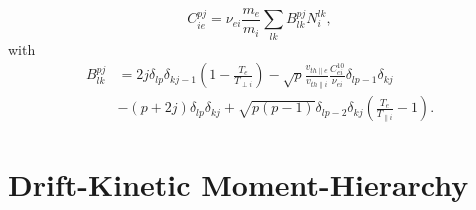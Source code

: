 {{%
\begin{equation}
    C_{ie}^{pj}=\nu_{ei}\frac{m_e}{m_i}\sum_{lk}B_{lk}^{pj}N_{i}^{lk},
    \label{eq:ciepj}
\end{equation}
%
with
%
\begin{equation}
\begin{split}
    B_{lk}^{pj}&=2j\delta_{lp}\delta_{kj-1}\left(1-\frac{T_e}{T_{\perp i}}\right)-\sqrt{ p}\frac{v_{th\parallel e}}{v_{th\parallel i}}\frac{C_{ei}^{10}}{\nu_{ei}}\delta_{lp-1}\delta_{kj}\\
    &-(p+2j)\delta_{lp}\delta_{kj}+\sqrt{ p (p-1)}\delta_{l p-2}\delta_{kj}\left(\frac{T_e}{T_{\parallel i}}-1\right).
\end{split}
\end{equation}

\section{Drift-Kinetic Moment-Hierarchy}
\label{sec:momenthierarchy}

}}
